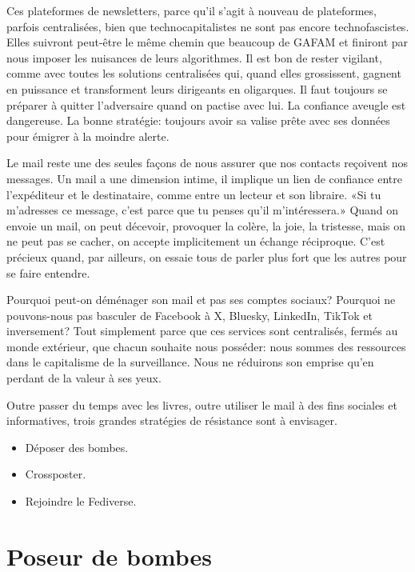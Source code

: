 \documentclass[a5paper, 10pt, twoside]{book}
\let\oldsection\section
\renewcommand{\section}[1]{%
  \oldsection{#1}%
  \par\vspace{\baselineskip}%
}
\providecommand{\tightlist}{%
  \setlength{\itemsep}{0pt}\setlength{\parskip}{0pt}%
}
\begin{document}
Ces plateformes de newsletters, parce qu’il s’agit à nouveau de
plateformes, parfois centralisées, bien que technocapitalistes ne sont
pas encore technofascistes. Elles suivront peut-être le même chemin que
beaucoup de GAFAM et finiront par nous imposer les nuisances de leurs
algorithmes. Il est bon de rester vigilant, comme avec toutes les
solutions centralisées qui, quand elles grossissent, gagnent en
puissance et transforment leurs dirigeants en oligarques. Il faut
toujours se préparer à quitter l’adversaire quand on pactise avec lui.
La confiance aveugle est dangereuse. La bonne stratégie: toujours avoir
sa valise prête avec ses données pour émigrer à la moindre alerte.

Le mail reste une des seules façons de nous assurer que nos contacts
reçoivent nos messages. Un mail a une dimension intime, il implique un
lien de confiance entre l’expéditeur et le destinataire, comme entre un
lecteur et son libraire. «Si tu m’adresses ce message, c’est parce que
tu penses qu’il m’intéressera.» Quand on envoie un mail, on peut
décevoir, provoquer la colère, la joie, la tristesse, mais on ne peut
pas se cacher, on accepte implicitement un échange réciproque. C’est
précieux quand, par ailleurs, on essaie tous de parler plus fort que les
autres pour se faire entendre.

Pourquoi peut-on déménager son mail et pas ses comptes sociaux? Pourquoi
ne pouvons-nous pas basculer de Facebook à X, Bluesky, LinkedIn, TikTok
et inversement? Tout simplement parce que ces services sont centralisés,
fermés au monde extérieur, que chacun souhaite nous posséder: nous
sommes des ressources dans le capitalisme de la surveillance. Nous ne
réduirons son emprise qu’en perdant de la valeur à ses yeux.

Outre passer du temps avec les livres, outre utiliser le mail à des fins
sociales et informatives, trois grandes stratégies de résistance sont à
envisager.

\begin{itemize}
\tightlist
\item
  Déposer des bombes.
\item
  Crossposter.
\item
  Rejoindre le Fediverse.
\end{itemize}

\section{\texorpdfstring{Poseur de bombes}{  }}\label{poseur-de-bombes}
\end{document}
